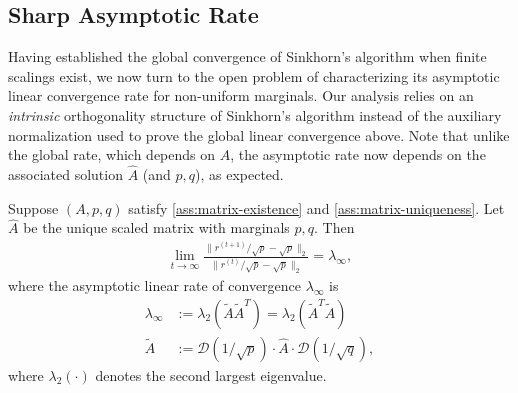 \subsection{Sharp Asymptotic Rate}
\label{subsec:sharp-rate}
Having established the global convergence of Sinkhorn's algorithm when finite scalings exist, we now turn to the open problem of characterizing its asymptotic linear convergence rate for non-uniform marginals. Our analysis relies on an \emph{intrinsic} orthogonality structure of Sinkhorn's algorithm instead of the auxiliary  normalization used to prove the global linear convergence above. Note that unlike the global rate, which depends on $A$, the asymptotic rate now depends on the associated solution $\hat A$ (and $p,q$), as expected.  
\begin{theorem}
\label{thm:convergence}
Suppose $(A,p,q)$ satisfy \cref{ass:matrix-existence} and \cref{ass:matrix-uniqueness}. Let $\hat{A}$
be the unique scaled matrix with marginals $p,q$. Then
\begin{align*}
\lim_{t\rightarrow \infty} \frac{\|r^{(t+1)}/\sqrt{p}-\sqrt{p}\|_{2} }{\|r^{(t)}/\sqrt{p}-\sqrt{p}\|_{2}} = \lambda_\infty,
\end{align*}
where the asymptotic linear rate of convergence $\lambda_\infty$ is
\begin{align*}
\lambda_\infty & :=\lambda_{2}(\tilde{A}\tilde{A}^{T})=\lambda_{2}(\tilde{A}^{T}\tilde{A})\\
\tilde{A} & :=\mathcal{D}(1/\sqrt{p})\cdot\hat{A}\cdot\mathcal{D}(1/\sqrt{q}),
\end{align*}
where $\lambda_{2}(\cdot)$ denotes the second largest eigenvalue. 
\end{theorem}

